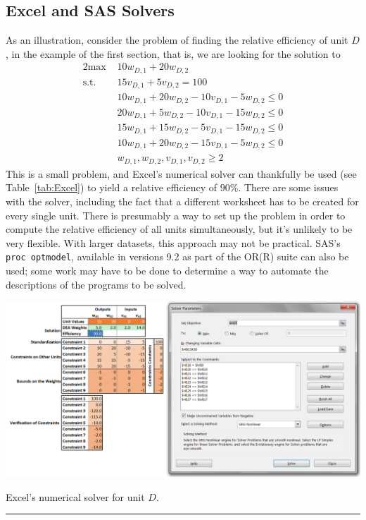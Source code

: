     \subsection{Excel and SAS Solvers}
As an illustration, consider the problem of finding the relative efficiency of unit $D$, in the example of the first section, that is, we are looking for the solution to 
  \begin{alignat*}{2}
    \text{max }   & 10w_{D,1}+20w_{D,2} \\
    \text{s.t. } & 15v_{D,1}+5v_{D,2} = 100 \\
                       & 10w_{D,1}+20w_{D,2}-10v_{D,1}-5w_{D,2}\leq 0 \\
                       & 20w_{D,1}+5w_{D,2}-10v_{D,1}-15w_{D,2}\leq 0 \\
                       & 15w_{D,1}+15w_{D,2}-5v_{D,1}-15w_{D,2}\leq 0 \\
                       & 10w_{D,1}+20w_{D,2}-15v_{D,1}-5w_{D,2}\leq 0 \\
                       & w_{D,1},w_{D,2},v_{D,1},v_{D,2}\geq 2
  \end{alignat*}
This is a small problem, and Excel's numerical solver can thankfully be used (see Table~\ref{tab:Excel}) to yield a relative efficiency of $90\%$. There are some issues with the solver, including the fact that a different worksheet has to be created for every single unit. There is presumably a way to set up the problem in order to compute the relative efficiency of all units simultaneously, but it's unlikely to be very flexible. With larger datasets, this approach may not be practical. 
\newl SAS's \texttt{proc optmodel}, available in versions 9.2 as part of the OR(R) suite can also be used; some work may have to be done to determine a way to automate the descriptions of the programs to be solved.    
\begin{table}[t]
  \begin{center}
    \includegraphics[width=\textwidth]{Images/DEA3}
  \end{center}
  \caption{\small Excel's numerical solver for unit $D$.}\hrule
  \label{tab:Excel}
\end{table}
